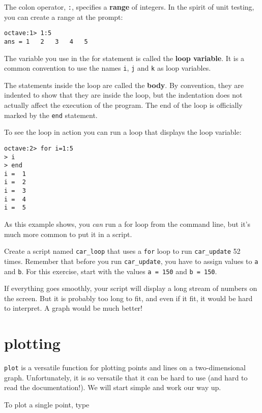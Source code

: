 The colon operator, {\tt :}, specifies a {\bf range} of integers. In
the spirit of unit testing, you can create a range at the prompt:

\begin{verbatim}
octave:1> 1:5
ans = 1   2   3   4   5
\end{verbatim}

The variable you use in the for statement is called the {\bf loop
variable}. It is a common convention to use the names {\tt i},
{\tt j} and {\tt k} as loop variables.

The statements inside the loop are called the {\bf body}. By convention,
they are indented to show that they are inside the loop, but the
indentation does not actually affect the execution of the program.
The end of the loop is officially marked by the {\tt end} statement.

To see the loop in action you can run a loop that displays the
loop variable:

\begin{verbatim}
octave:2> for i=1:5
> i
> end
i =  1
i =  2
i =  3
i =  4
i =  5
\end{verbatim}

As this example shows, you {\em can} run a for loop from the
command line, but it's much more common to put it in a script.

\begin{ex}
Create a script named {\tt car\_loop} that uses a {\tt for}
loop to run {\tt car\_update} 52 times. Remember that before you run
{\tt car\_update}, you have to assign values to {\tt a} and {\tt b}.
For this exercise, start with the values {\tt a = 150} and {\tt b =
150}.

If everything goes smoothly, your script will display a long stream
of numbers on the screen. But it is probably too long
to fit, and even if it fit, it would be hard to interpret. 
A graph would be much better!
\end{ex}


\section{plotting}
\label{plotting}

{\tt plot} is a versatile function for plotting points and lines
on a two-dimensional graph. Unfortunately, it is so versatile
that it can be hard to use (and hard to read the documentation!).
We will start simple and work our way up.

To plot a single point, type

